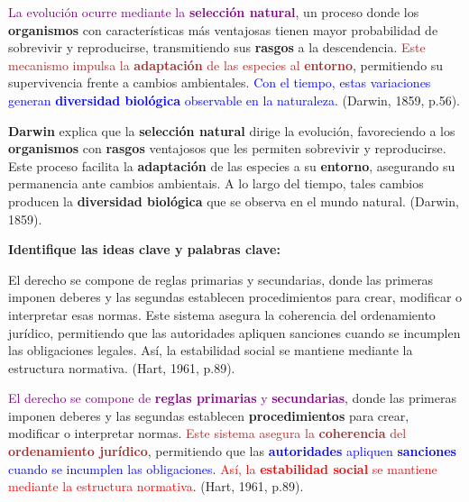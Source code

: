 \documentclass[
11pt, %
]{beamer}
\begin{document}
\begin{frame}
	\begin{block}{} %
		\textcolor{purple}{La evolución ocurre mediante la \textbf{selección natural}}, un proceso donde los \textbf{organismos} con características más ventajosas tienen mayor probabilidad de sobrevivir y reproducirse, transmitiendo sus \textbf{rasgos} a la descendencia. \textcolor{brown}{Este mecanismo impulsa la \textbf{adaptación} de las especies al \textbf{entorno}}, permitiendo su supervivencia frente a cambios ambientales. \textcolor{blue}{Con el tiempo, estas variaciones generan \textbf{diversidad biológica} observable en la naturaleza}. (Darwin, 1859, p.56).
	\end{block}
\end{frame}

\begin{frame}
	\begin{block}{} %
		\textbf{Darwin} explica que la \textbf{selección natural} dirige la evolución, favoreciendo a los \textbf{organismos} con \textbf{rasgos} ventajosos que les permiten sobrevivir y reproducirse. Este proceso facilita la \textbf{adaptación} de las especies a su \textbf{entorno}, asegurando su permanencia ante cambios ambientais. A lo largo del tiempo, tales cambios producen la \textbf{diversidad biológica} que se observa en el mundo natural. (Darwin, 1859).
	\end{block}
\end{frame}


\begin{frame}
	\textbf{Identifique las ideas clave y palabras clave:}
	\begin{block}{} %
		El derecho se compone de reglas primarias y secundarias, donde las primeras imponen deberes y las segundas establecen procedimientos para crear, modificar o interpretar esas normas. Este sistema asegura la coherencia del ordenamiento jurídico, permitiendo que las autoridades apliquen sanciones cuando se incumplen las obligaciones legales. Así, la estabilidad social se mantiene mediante la estructura normativa. (Hart, 1961, p.89).
	\end{block}
\end{frame}

\begin{frame}
	\begin{block}{} %
		\textcolor{purple}{El derecho se compone de \textbf{reglas primarias} y \textbf{secundarias}}, donde las primeras imponen deberes y las segundas establecen \textbf{procedimientos} para crear, modificar o interpretar normas. \textcolor{brown}{Este sistema asegura la \textbf{coherencia} del \textbf{ordenamiento jurídico}}, permitiendo que las \textcolor{blue}{\textbf{autoridades} apliquen \textbf{sanciones} cuando se incumplen las obligaciones}. \textcolor{red}{Así, la \textbf{estabilidad social} se mantiene mediante la estructura normativa}. (Hart, 1961, p.89).
	\end{block}
\end{frame}
\end{document}
